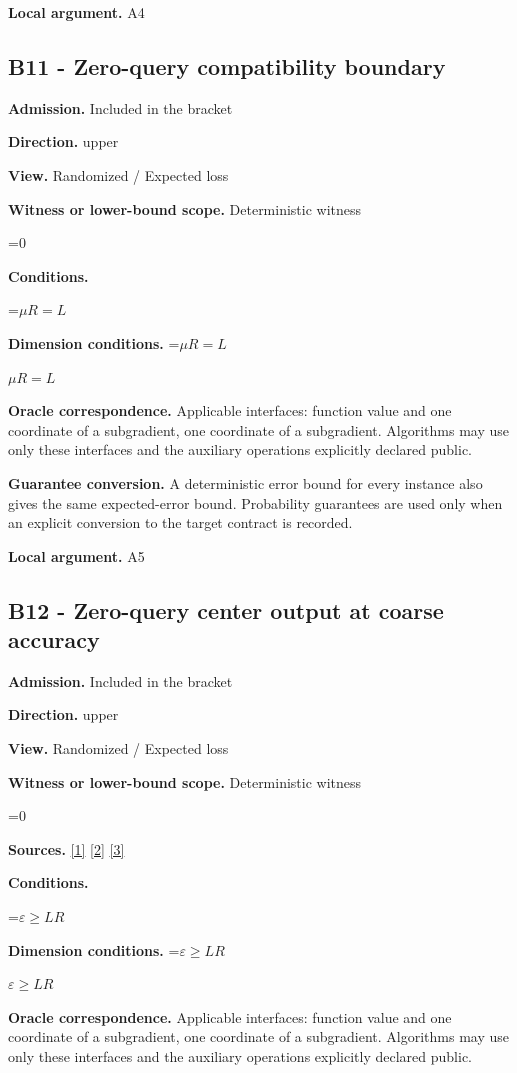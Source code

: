 \documentclass[10pt,a4paper]{article}
\newcommand{\AtlasMath}[1]{\par\begingroup\centering\setbox0=\hbox{$\displaystyle #1$}\ifdim\wd0>1.4\linewidth\typeout{ATLAS WIDE FORMULA: \the\wd0}\fi\ifdim\wd0>\linewidth\resizebox{\linewidth}{!}{\box0}\else\box0\fi\par\endgroup}
\newcommand{\AtlasInlineMath}[1]{\begingroup\setbox0=\hbox{$#1$}\ifdim\wd0>.4\linewidth\endgroup\AtlasMath{#1}\else\endgroup$#1$\fi}
\begin{document}
\textbf{Local argument.} A4

\subsection{B11 - Zero-query compatibility boundary}
\textbf{Admission.} Included in the bracket

\textbf{Direction.} upper

\textbf{View.} Randomized / Expected loss

\textbf{Witness or lower-bound scope.} Deterministic witness

\AtlasMath{0}
\textbf{Conditions.} 
\AtlasMath{\mu R=L}


\textbf{Dimension conditions.} \AtlasInlineMath{\mu R=L}

\textbf{Oracle correspondence.} Applicable interfaces: function value and one coordinate of a subgradient, one coordinate of a subgradient. Algorithms may use only these interfaces and the auxiliary operations explicitly declared public.

\textbf{Guarantee conversion.} A deterministic error bound for every instance also gives the same expected-error bound. Probability guarantees are used only when an explicit conversion to the target contract is recorded.

\textbf{Local argument.} A5

\subsection{B12 - Zero-query center output at coarse accuracy}
\textbf{Admission.} Included in the bracket

\textbf{Direction.} upper

\textbf{View.} Randomized / Expected loss

\textbf{Witness or lower-bound scope.} Deterministic witness

\AtlasMath{0}
\textbf{Sources.} \href{https://arxiv.org/pdf/1405.4980}{[1]} \href{https://www2.isye.gatech.edu/~nemirovs/MOR_AccuracyCertificates.pdf}{[2]} \href{https://arxiv.org/pdf/2609.20701}{[3]}

\textbf{Conditions.} 
\AtlasMath{\varepsilon\ge LR}


\textbf{Dimension conditions.} \AtlasInlineMath{\varepsilon\ge LR}

\textbf{Oracle correspondence.} Applicable interfaces: function value and one coordinate of a subgradient, one coordinate of a subgradient. Algorithms may use only these interfaces and the auxiliary operations explicitly declared public.
\end{document}
